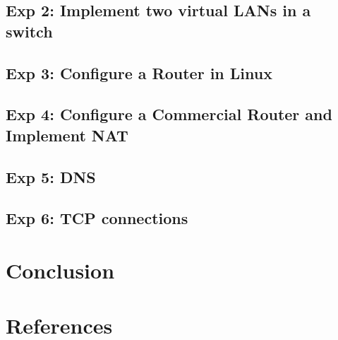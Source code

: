 \documentclass[compilation.tex]{subfiles}
\begin{document}
\subsection{Exp 2: Implement two virtual LANs in a switch}
\label{exp:2}


\subsection{Exp 3: Configure a Router in Linux}
\label{exp:3}

\subsection{Exp 4: Configure a Commercial Router and Implement NAT}
\label{exp:4}

\subsection{Exp 5: DNS}
\label{exp:5}

\subsection{Exp 6: TCP connections}
\label{exp:6}

\section{Conclusion}
\label{sec:conclusion}

\section{References}
\label{sec:references}
\end{document}
